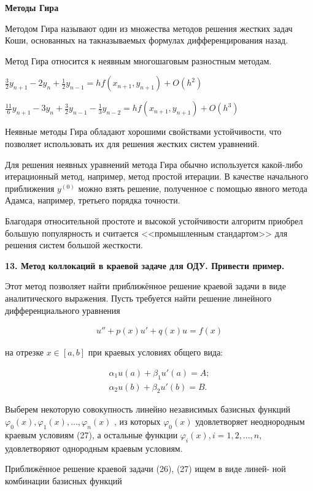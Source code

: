 \documentclass[a4paper,14pt]{article}
\begin{document}
\textbf{Методы Гира}

Методом Гира называют один из множества методов решения жестких задач Коши, основанных на 
такназываемых формулах дифференцирования назад.

Метод Гира относится к неявным многошаговым разностным методам.

$\frac{3}{2} y_{n+1} - 2 y_n + \frac{1}{2} y_{n-1} = h f(x_{n+1}, y_{n+1}) + O(h^2)$

$\frac{11}{6} y_{n+1} - 3 y_n + \frac{3}{2} y_{n-1} - \frac{1}{3} y_{n-2} = h f(x_{n+1}, y_{n+1}) + O(h^3)$

Неявные методы Гира обладают хорошими свойствами устойчивости, что 
позволяет использовать их для решения жестких систем уравнений.

Для решения неявных уравнений метода Гира обычно используется 
какой-либо итерационный метод, например, метод простой итерации. 
В качестве начального приближения $y^{(0)}$ можно взять решение, 
полученное с помощью явного метода Адамса, например, третьего порядка точности.

Благодаря относительной простоте и высокой устойчивости алгоритм приобрел большую популярность и считается 
<<промышленным стандартом>> для решения систем большой жесткости.

\textbf{13. Метод коллокаций в краевой задаче для ОДУ. Привести пример.}

Этот метод позволяет найти приближённое решение краевой задачи в
виде аналитического выражения. Пусть требуется найти решение линейного
дифференциального уравнения


\begin{eqnarray}
	u'' + p(x) u' + q(x) u = f(x)
\end{eqnarray}

на отрезке $x \in [a, b]$ при краевых условиях общего вида:

\begin{eqnarray}
	\alpha_1 u(a) + \beta_1 u'(a) = A; \nonumber \\
	\alpha_2 u(b) + \beta_2 u'(b) = B.
\end{eqnarray}

Выберем некоторую совокупность линейно независимых базисных
функций $\varphi_0(x), \varphi_1(x), ..., \varphi_n(x)$ , из которых
$\varphi_0(x)$ удовлетворяет неоднородным краевым условиям (27), а остальные функции
$\varphi_i(x), i = 1, 2, ..., n$, удовлетворяют однородным краевым условиям.

Приближённое решение краевой задачи (26), (27) ищем в виде линей-
ной комбинации базисных функций
\end{document}
